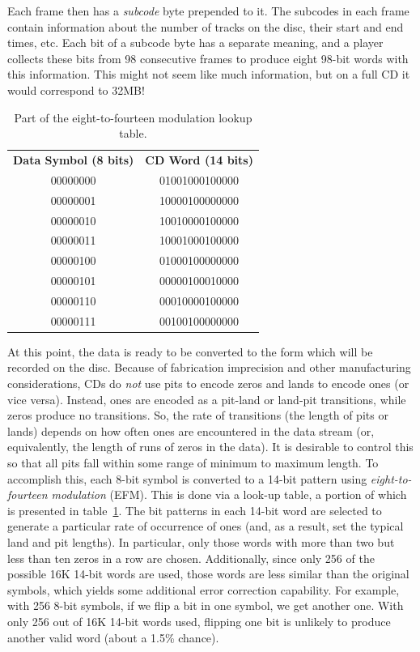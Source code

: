Each frame then has a \emph{subcode} byte prepended to it.  The
subcodes in each frame contain information about the number of tracks
on the disc, their start and end times, etc. Each bit of a subcode
byte has a separate meaning, and a player collects these bits from 98
consecutive frames to produce eight 98-bit words with this
information. This might not seem like much information, but on a full
CD it would correspond to 32MB!

\begin{table}
\caption{Part of the eight-to-fourteen modulation lookup
table.\label{tb:efm}}
\begin{center}
\begin{tabular}{cc}
\textbf{Data Symbol (8 bits)} & \textbf{CD Word (14 bits)}\\
00000000 & 01001000100000 \\
00000001 & 10000100000000 \\
00000010 & 10010000100000 \\
00000011 & 10001000100000 \\
00000100 & 01000100000000 \\
00000101 & 00000100010000 \\
00000110 & 00010000100000 \\
00000111 & 00100100000000
\end{tabular}
\end{center}
\end{table}

At this point, the data is ready to be converted to the form which
will be recorded on the disc. Because of fabrication imprecision and
other manufacturing considerations, CDs do \emph{not} use pits to
encode zeros and lands to encode ones (or vice versa). Instead, ones
are encoded as a pit-land or land-pit transitions, while zeros produce
no transitions. So, the rate of transitions (the length of pits or
lands) depends on how often ones are encountered in the data stream
(or, equivalently, the length of runs of zeros in the data). It is
desirable to control this so that all pits fall within some range of
minimum to maximum length. To accomplish this, each 8-bit symbol is
converted to a 14-bit pattern using \emph{eight-to-fourteen
modulation} (EFM). This is done via a look-up table, a portion of
which is presented in table~\ref{tb:efm}. The bit patterns in each
14-bit word are selected to generate a particular rate of occurrence
of ones (and, as a result, set the typical land and pit lengths). In
particular, only those words with more than two but less than ten
zeros in a row are chosen.  Additionally, since only 256 of the
possible 16K 14-bit words are used, those words are less similar than
the original symbols, which yields some additional error correction
capability. For example, with 256 8-bit symbols, if we flip a bit in
one symbol, we get another one. With only 256 out of 16K 14-bit words
used, flipping one bit is unlikely to produce another valid word
(about a 1.5\% chance).

